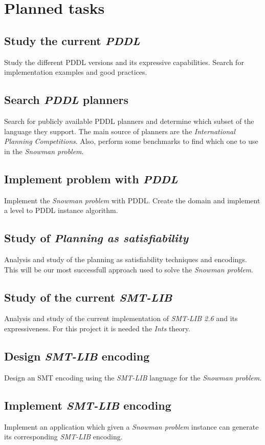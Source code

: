 \documentclass{report}
\theoremstyle{plain}
\begin{document}
\section{Planned tasks}
\subsection{Study the current \emph{PDDL}}
Study the different PDDL versions and its expressive capabilities. Search for implementation examples and good practices. 

\subsection{Search \emph{PDDL} planners}
Search for publicly available PDDL planners and determine which subset of the language they support. The main source of planners are the \emph{International Planning Competitions}. Also, perform some benchmarks to find which one to use in the \emph{Snowman problem}.

\subsection{Implement problem with \emph{PDDL}}
Implement the \emph{Snowman problem} with PDDL. Create the domain and implement a level to PDDL instance algorithm.

\subsection{Study of \emph{Planning as satisfiability}}
Analysis and study of the planning as satisfiability techniques and encodings. This will be our most successfull approach used  to solve the \emph{Snowman problem}.

\subsection{Study of the current \emph{SMT-LIB}}
Analysis and study of the current implementation of \emph{SMT-LIB 2.6} and its expressiveness. For this project it is needed the \emph{Ints} theory.

\subsection{Design \emph{SMT-LIB} encoding}
Design an SMT encoding using the \emph{SMT-LIB} language for the \emph{Snowman problem}. 

\subsection{Implement \emph{SMT-LIB} encoding}
Implement an application which given a \emph{Snowman problem} instance can generate its corresponding \emph{SMT-LIB} encoding. 
\end{document}
